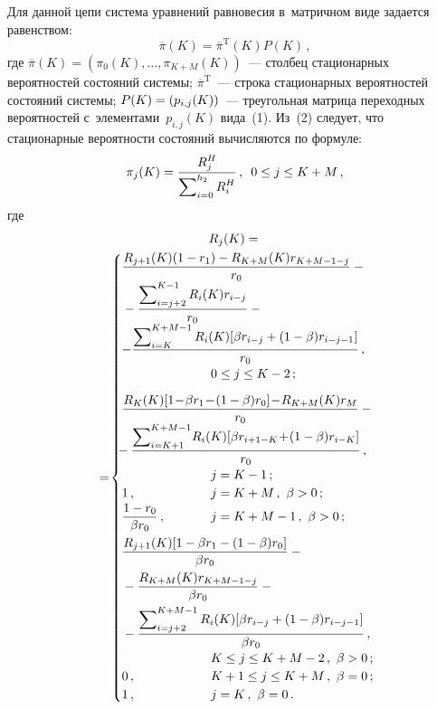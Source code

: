 \begin{multicols}{2}
  Для данной цепи система уравнений равновесия в~матричном виде задается 
равенством:
  \begin{equation}
  \overline{\pi}(K)=\overline{\pi}^{\mathrm{T}}(K) P(K)\,,
  \label{e2-aga}
  \end{equation}
где $\overline{\pi}(K)=(\pi_0(K), \ldots , \pi_{K+M}(K))$~--- столбец 
стационарных вероятностей состояний сис\-те\-мы; $\overline{\pi}^{\mathrm{T}}$~--- строка 
стационарных вероятностей состояний сис\-те\-мы; $P(K)\hm=  
(p_{i,j}(K))$~--- треугольная мат\-ри\-ца переходных вероятностей 
с~элементами~$p_{i,j}(K)$ вида~(1). Из~(2) следует, что стационарные 
вероятности состояний вычисляются по формуле:
$$
\pi_j(K)=\displaystyle\frac{\displaystyle R_j^H\mathstrut}{\displaystyle \sum\nolimits_{i=0}^{h_2} R_i^H\mathstrut}\,,\enskip 0\leq j\leq 
K+M\,,
$$
  где
  \begin{multline*}
  R_j(K)={}\\
  {}=\!\begin{cases}
  \displaystyle \fr{R_{j+1}(K)(1-r_1) - R_{K+M}(K) r_{K+M-1-j}}{r_0} -{}\hspace*{-60mm}\\
{}-\fr{\sum\nolimits_{i=j+2}^{K-1}  
R_i(K) r_{i-j}}{r_0}-{}\hspace*{-60mm}\\
  \displaystyle -\fr{\sum\nolimits_{i=K}^{K+M-1} R_i(K) [\beta r_{i-j} +(1-\beta) 
r_{i-j-1}]}{r_0}\,,\hspace*{-60mm}\\ 
&0\leq j\leq K-2\,;\\[9pt]
  \displaystyle \fr{R_K(K)[1\!-\!\beta r_1\!-\!(1-\beta)r_0] \!-\!R_{K+M}(K) r_M}{r_0}-
{}\hspace*{-60mm}\\
\!\!\!  \displaystyle
 {}-\fr{\sum\nolimits_{i=K+1}^{K+M-1} \!R_i(K) [\beta r_{i+1-K}\! + \!
(1-\beta) r_{i-K}]}{r_0}\,,\hspace*{-60mm}\\
&j=K-1\,;\\
  1\,, & j=K+M\,,\ \beta>0\,;\\
  \displaystyle \fr{1-r_0}{\beta r_0}\,, & j=K+M-1\,,\ \beta>0\,;\\[9pt]
  \fr{R_{j+1}(K) [1-\beta r_1 -(1-\beta)r_0] }{\beta r_0}-{}\hspace*{-60mm}&\\[9pt]
  {}-\fr{ R_{K+M}(K) r_{K+M-1-j}}{\beta r_0}-{}\hspace*{-60mm}&\\[9pt]
{} \displaystyle - \fr{\sum\nolimits_{i=j+2}^{K+M-1} R_i(K) [\beta r_{i-j} + 
  (1-\beta) r_{i-j-1}]}{\beta r_0}\,, \hspace*{-136.2pt}\\
  &  K\leq j\leq K+M-2\,,\ \beta>0\,;\\
  0\,, & K+1\leq j\leq K+M\,,\ \beta=0\,;\\
  1\,,& j=K\,,\ \beta=0\,.
  \end{cases}
  \end{multline*}
  

\end{multicols}
